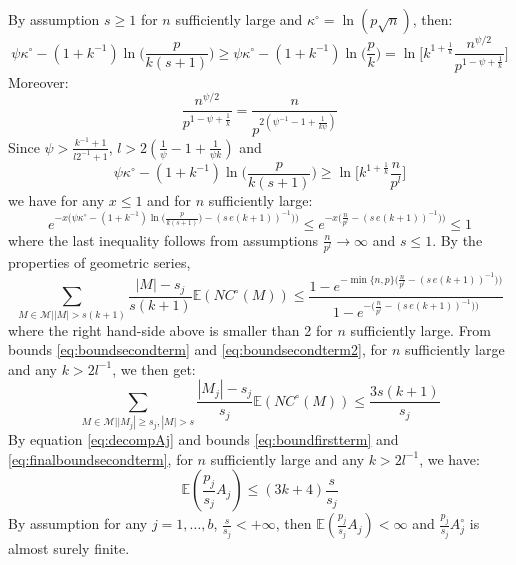 \documentclass[aos]{imsart}
\theoremstyle{plain}
\newcommand{\E}{\mathbb{E}}
\begin{document}
\begin{supplement}
\begin{equation*}
\end{equation*}
By assumption $s\geq1$ for $n$ sufficiently large and $\kappa^{\circ}=\ln(p\sqrt{n})$, then:
$$\psi \kappa^{\circ}-(1+k^{-1})\ln\big(\frac{p}{k(s+1)} \big)\geq \psi \kappa^{\circ}-(1+k^{-1})\ln\big(\frac{p}{k}\big) =   \ln\bigg[k^{1+\frac{1}{k}}\frac{n^{\psi/2}}{p^{1-\psi+\frac{1}{k}}}\bigg]$$
Moreover:
$$\frac{n^{\psi/2}}{p^{1-\psi+\frac{1}{k}}}=\frac{n}{p^{2(\psi^{-1}-1+\frac{1}{k\psi})}}$$
Since $\psi> \frac{k^{-1}+1}{l2^{-1}+1}$,  $l > 2(\frac{1}{\psi}-1+\frac{1}{\psi k})$ and
$$\psi \kappa^{\circ}-(1+k^{-1})\ln\big(\frac{p}{k(s+1)} \big)\geq \ln\bigg[k^{1+\frac{1}{k}}\frac{n}{p^l}\bigg]$$
we have for any $x\leq 1$ and for $n$ sufficiently large:
$$e^{-x\big(\psi \kappa^{\circ}-(1+k^{-1})\ln\big(\frac{p}{k(s+1)}\big)-\left(s\,e(k+1)\right)^{-1})\big)}\leq e^{-x\big(\frac{n}{p^l}-\left(s\,e(k+1)\right)^{-1})\big)}\leq 1$$
where the last inequality follows from assumptions $\frac{n}{p^l}\to\infty$ and $s\leq 1$. By the properties of geometric series,
$$\sum_{M \in \mathcal{M} ||M| > s(k+1)}\frac{|M|-
s_j}{s(k+1)}\E(NC^{\circ}(M) ) \leq \frac{1-e^{-\min\{n,p\}\big(\frac{n}{p^l}-\left(s\,e(k+1)\right)^{-1})\big)}}{1-e^{-\big(\frac{n}{p^l}-\left(s\,e(k+1)\right)^{-1})\big)}}$$
where the right hand-side above is smaller than 2 for $n$ sufficiently large.
From bounds \eqref{eq:boundsecondterm} and \eqref{eq:boundsecondterm2}, for $n$ sufficiently large and any $k>2l^{-1}$, we then get: 
\begin{equation}\label{eq:finalboundsecondterm}
     \sum_{M \in \mathcal{M} | |M_j| \geq s_j, |M| > s}\frac{|M_j|-s_j}{s_j}\E(NC^{\circ}(M)) \leq \frac{3s(k+1)}{s_j}
\end{equation}
By equation \eqref{eq:decompAj} and bounds \eqref{eq:boundfirstterm} and \eqref{eq:finalboundsecondterm}, for $n$ sufficiently large and any $k>2l^{-1}$, we have:
$$\E(\frac{p_j}{s_j}A_j)\leq (3k+4)\frac{s}{s_j}$$
By assumption for any $j=1,\ldots,b$, $\frac{s}{s_j}<+\infty$, then $\E(\frac{p_j}{s_j}A_j) < \infty$ and $\frac{p_j}{s_j}A^{\circ}_j$ is almost surely finite. 


\end{supplement}
\end{document}
